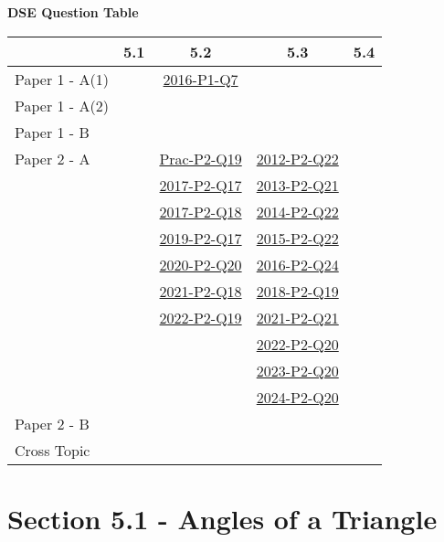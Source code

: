 \documentclass[12pt, a4paper]{article}
\begin{document}
\begin{absolutelynopagebreak}
\begin{center}
\textbf{DSE Question Table}
\end{center}
\begin{center}
\begin{tabular}{|l|c|c|c|c|}
\hline
        & 5.1 & 5.2 & 5.3 & 5.4 \\\hline
\hline
Paper 1 - A(1)&  & \hyperref[DSE2016-CoreP1-Q07]{2016-P1-Q7} &  &  \\
\hline
Paper 1 - A(2)&  &  &  &  \\
\hline
Paper 1 - B&  &  &  &  \\
\hline
\hline
Paper 2 - A&  & \hyperref[DSE2012P-CoreP2-Q19]{Prac-P2-Q19} & \hyperref[DSE2012-CoreP2-Q22]{2012-P2-Q22} &  \\
&  & \hyperref[DSE2017-CoreP2-Q17]{2017-P2-Q17} & \hyperref[DSE2013-CoreP2-Q21]{2013-P2-Q21} &  \\
&  & \hyperref[DSE2017-CoreP2-Q18]{2017-P2-Q18} & \hyperref[DSE2014-CoreP2-Q22]{2014-P2-Q22} &  \\
&  & \hyperref[DSE2019-CoreP2-Q17]{2019-P2-Q17} & \hyperref[DSE2015-CoreP2-Q22]{2015-P2-Q22} &  \\
&  & \hyperref[DSE2020-CoreP2-Q20]{2020-P2-Q20} & \hyperref[DSE2016-CoreP2-Q24]{2016-P2-Q24} &  \\
&  & \hyperref[DSE2021-CoreP2-Q18]{2021-P2-Q18} & \hyperref[DSE2018-CoreP2-Q19]{2018-P2-Q19} &  \\
&  & \hyperref[DSE2022-CoreP2-Q19]{2022-P2-Q19} & \hyperref[DSE2021-CoreP2-Q21]{2021-P2-Q21} &  \\
&  &  & \hyperref[DSE2022-CoreP2-Q20]{2022-P2-Q20} &  \\
&  &  & \hyperref[DSE2023-CoreP2-Q20]{2023-P2-Q20} &  \\
&  &  & \hyperref[DSE2024-CoreP2-Q20]{2024-P2-Q20} &  \\
\hline
Paper 2 - B&  &  &  &  \\
\hline
\hline
Cross Topic&  &  &  &  \\
\hline
\end{tabular}
\end{center}
\end{absolutelynopagebreak}




\section*{Section 5.1 - Angles of a Triangle}\label{section:2-5-1}
\end{document}
